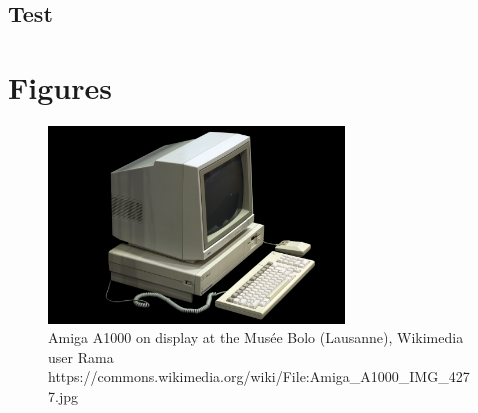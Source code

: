 \documentclass{jlcl}
\begin{document}
\subsection{Test}




\section{Figures}

\begin{figure}[h]
\centering
\includegraphics[width=0.7\textwidth]{Amiga_A1000.jpg}
\caption{Amiga A1000 on display at the Musée Bolo (Lausanne), Wikimedia user Rama \newline https://commons.wikimedia.org/wiki/File:Amiga\_A1000\_IMG\_4277.jpg}
\end{figure}

\nocite{*}



\end{document}
